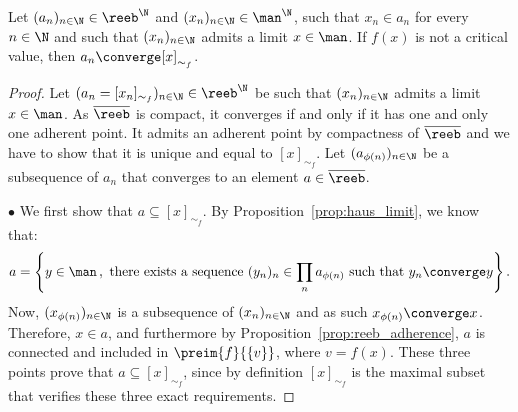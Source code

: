 \begin{lemma}\label{lem:haus_cont}
Let $(a_n)_{n\in\N}\in\reeb^{\N}$ and $(x_n)_{n\in\N}\in\man^{\N}$, such that $x_n\in a_n$ 
for every $n\in\N$ and such that $(x_n)_{n\in\N}$ admits a limit $x \in \man$. 
If $f(x)$ is not a critical value, then $a_n\converge [x]_{\sim_f}$.
\end{lemma}
\begin{proof}
Let $(a_n=[x_n]_{\sim_f})_{n\in\N} \in \reeb^{\N}$ be such that $(x_n)_{n\in\N}$ admits a limit $x \in \man$. As $\overline{\reeb}$ is compact, it converges if and only if it has one and only one adherent point. It admits an adherent point by compactness of $\overline{\reeb}$ and we have to show that it is unique and equal to $[x]_{\sim_f}$. Let $(a_{\phi(n)})_{n\in\N}$ be a subsequence of $a_n$ that converges to an element $a\in\overline{\reeb}$. 

$\bullet$ We first show that $a\subseteq[x]_{\sim_f}$. By Proposition~\ref{prop:haus_limit}, we know that:
$$a=\left\{y \in \man \, , \textrm{ there exists a sequence } (y_n)_n  \in \prod_n a_{\phi(n)} 
\textrm{ such that } y_n \converge y \right\}.$$
Now, $(x_{\phi(n)})_{n\in\N}$ is a subsequence of $(x_n)_{n\in\N}$ and as such $x_{\phi(n)}\converge x$. Therefore, $x\in a$, and furthermore by Proposition~\ref{prop:reeb_adherence}, $a$ is connected and included in $\preim{f}{\{v\}}$, where $v=f(x)$. These three points prove that $a\subseteq[x]_{\sim_f}$, since by definition $[x]_{\sim_f}$ is the maximal subset that verifies these three exact requirements. 


\end{proof}
